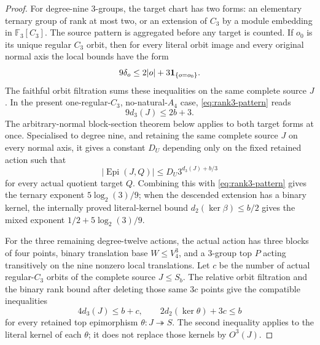 \begin{proof}
For degree-nine $3$-groups, the target chart has two forms: an elementary
ternary group of rank at most two, or an extension of $C_3$ by a module
embedding in $\mathbb F_3[C_3]$.  The source pattern is aggregated before
any target is counted.  If $o_0$ is its unique regular $C_3$ orbit, then for
every literal orbit image and every original normal axis the local bounds
have the form
\[
 9\delta_o\leq 2|o|+3{\bf1}_{\{o=o_0\}}.
\]
The faithful orbit filtration sums these inequalities on the same complete
source $J$.  In the present one-regular-$C_3$, no-natural-$A_4$ case,
\eqref{eq:rank3-pattern} reads
\[
 9d_3(J)\leq 2b+3.
\]
The arbitrary-normal block-section theorem below applies to both target
forms at once.  Specialised to degree nine, and retaining the same complete
source $J$ on every normal axis, it gives a constant $D_U$ depending only on
the fixed retained action such that
\begin{equation}\label{eq:degree-nine-joint}
 |\operatorname{Epi}(J,Q)|\leq D_U3^{d_3(J)+b/3}
\end{equation}
for every actual quotient target $Q$.
Combining this with \eqref{eq:rank3-pattern} gives the ternary exponent
$5\log_2(3)/9$; when the descended extension has a binary kernel, the
internally proved literal-kernel bound $d_2(\ker\beta)\leq b/2$ gives the
mixed exponent $1/2+5\log_2(3)/9$.

For the three remaining degree-twelve actions, the actual action has
three blocks of four points, binary translation base $W\leq V_4^3$,
and a $3$-group top $P$ acting transitively on the nine nonzero local
translations.  Let $c$ be the number of actual regular-$C_3$ orbits
of the complete source $J\leq S_b$.  The relative orbit filtration and
the binary rank bound after deleting those same $3c$ points give the
compatible inequalities
\begin{equation}\label{eq:inv12-joint-support}
 4d_3(J)\leq b+c,
 \qquad
 2d_2(\ker\theta)+3c\leq b
\end{equation}
for every retained top epimorphism $\theta:J\twoheadrightarrow S$.
The second inequality applies to the literal kernel of each $\theta$;
it does not replace those kernels by $O^3(J)$.


\end{proof}
